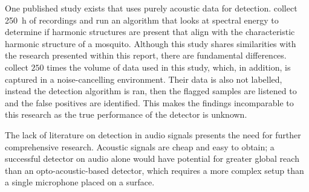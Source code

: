         One published study exists that uses purely acoustic data for detection. \textcite{D.R.Raman2007} collect \SI{250}{\hour} of recordings and run an algorithm that looks at spectral energy to determine if harmonic structures are present that align with the characteristic harmonic structure of a mosquito. Although this study shares similarities with the research presented within this report, there are fundamental differences. \textcite{D.R.Raman2007} collect $250$ times the volume of data used in this study, which, in addition, is captured in a noise-cancelling environment. Their data is also not labelled, instead the detection algorithm is ran, then the flagged samples are listened to and the false positives are identified. This makes the findings incomparable to this research as the true performance of the detector is unknown.
        
        The lack of literature on detection in audio signals presents the need for further comprehensive research. Acoustic signals are cheap and easy to obtain; a successful detector on audio alone would have potential for greater global reach than an opto-acoustic-based detector, which requires a more complex setup than a single microphone placed on a surface.